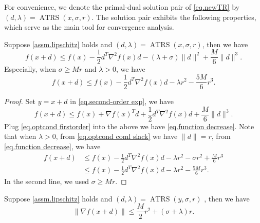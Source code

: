 \documentclass{article}
\begin{document}
For convenience, we denote the primal-dual solution pair of \eqref{eq.newTR} by $(d,\lambda) = \operatorname{ATRS}(x, \sigma, r)$. The solution pair exhibits the following properties, which serve as the main tool for convergence analysis.
\begin{lemma}
    \label{lem.function decrease}
    Suppose \autoref{assm.lipschitz} holds and $(d,\lambda) = \operatorname{ATRS}(x,\sigma,r)$, then we have
    \begin{equation}
        \label{eq.function decrease}
        f(x+d) \leq f(x) -\frac{1}{2}d^T \nabla^2 f(x) d -(\lambda+\sigma)\|d\|^2 +\frac{M}{6}\|d\|^3.
    \end{equation}
    Especially, when $\sigma \geq M r$ and $\lambda>0$, we have
    \begin{equation}
        \label{eq.function decrease advanced}
        f(x+d) \leq f(x)-\frac{1}{2}d^T \nabla^2 f(x) d-\lambda r^2 -\frac{5M}{6} r^3.
    \end{equation}
\end{lemma}
\begin{proof} 
    Set $y=x+d$ in \eqref{eq.second-order exp}, we have 
    \begin{equation*}
        f(x+d) \leq f(x) +\nabla f(x)^T d +\frac{1}{2}d^T \nabla ^2 f(x) d +\frac{M}{6}\|d\|^3.
    \end{equation*}
    Plug \eqref{eq.optcond firstorder} into the above we have \eqref{eq.function decrease}. Note that when $\lambda>0$, from \eqref{eq.optcond coml slack} we have $\|d\| = r$, from \eqref{eq.function decrease}, we have
    \begin{equation*}
        \begin{aligned}
            f(x+d)&\leq f(x)-\frac{1}{2}d^T \nabla^2 f(x)d-\lambda r^2-\sigma r^2+\frac{M}{6}r^3\\
            &\leq f(x)-\frac{1}{2}d^T \nabla^2 f(x) d-\lambda r^2 -\frac{5M}{6} r^3.
        \end{aligned}
    \end{equation*}
    In the second line, we used $\sigma \geq M r.$
\end{proof}
\begin{lemma}
    \label{lem.bound next gradient}
    Suppose \autoref{assm.lipschitz} holds and $(d,\lambda)= \operatorname{ATRS}(y,\sigma,r)$ , then we have
    \begin{equation}
        \label{eq.bound next gradient}
        \|\nabla f(x+d)\| \leq \frac{M}{2}r^2+(\sigma+\lambda)r.
    \end{equation}
\end{lemma}
\end{document}
